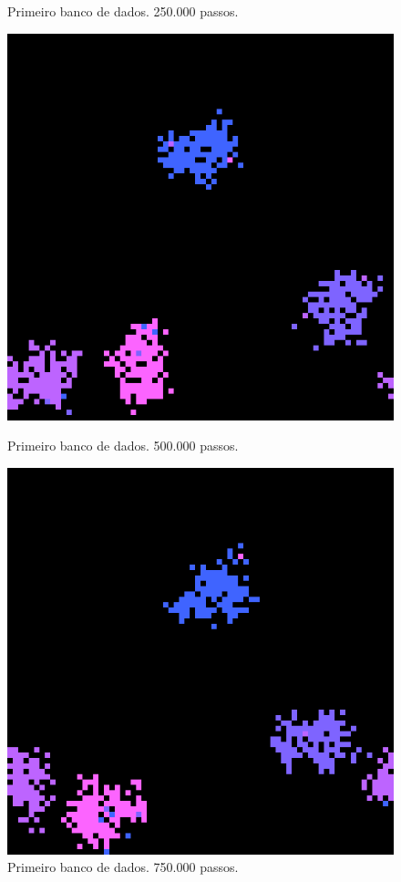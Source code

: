 \documentclass[conference]{IEEEtran}
\begin{document}
\begin{figure}[H]
\begin{minipage}[b]{0.5\linewidth}
    \caption{Primeiro banco de dados. 250.000 passos.} 
    \vspace{4ex}
  \end{minipage} 
  \begin{minipage}[b]{0.5\linewidth}
    \centering
    \includegraphics[width=.8\linewidth]{resultados/data/dataset_one/2-2.png} 
    \caption{Primeiro banco de dados. 500.000 passos.} 
    \vspace{4ex}
  \end{minipage}%
  \begin{minipage}[b]{0.5\linewidth}
    \centering
    \includegraphics[width=.8\linewidth]{resultados/data/dataset_one/2-3.png} 
    \caption{Primeiro banco de dados. 750.000 passos.} 
    \vspace{4ex}
  \end{minipage}
\end{figure}
\end{document}
